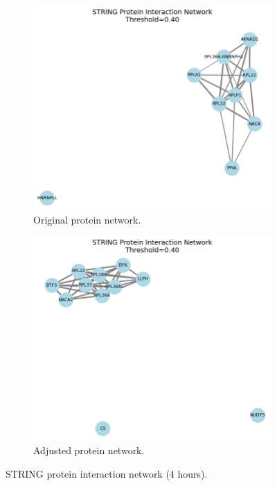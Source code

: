 \documentclass{article}
\begin{document}
      \begin{figure}[H]
        \centering
        \begin{subfigure}{0.45\textwidth}
            \includegraphics[width=\linewidth]{figures/protein_network_4h.png}
            \caption{Original protein network.}
            \label{fig:protein_network_4h}
        \end{subfigure}
        \hfill
        \begin{subfigure}{0.45\textwidth}
            \includegraphics[width=\linewidth]{figures/protein_network_fdr_4h.png}
            \caption{Adjusted protein network.}
            \label{fig:protein_network_fdr_4h}
        \end{subfigure}
        \caption{STRING protein interaction network (4 hours).}
        \label{fig:protein_network_all_4h}
      \end{figure}
\end{document}
